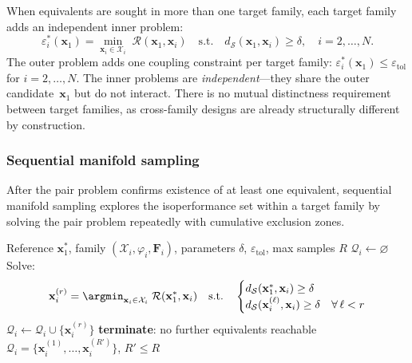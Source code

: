 When equivalents are sought in more than one target family, each target family adds an independent inner problem:
\begin{equation}
    \varepsilon_i^*(\mathbf{x}_1) = \min_{\mathbf{x}_i \in \mathcal{X}_i}\;
    \mathcal{R}(\mathbf{x}_1, \mathbf{x}_i)
    \quad \text{s.t.} \quad
    d_{\mathcal{S}}(\mathbf{x}_1, \mathbf{x}_i) \geq \delta,
    \quad i = 2, \ldots, N.
    \label{eq:multi_inner}
\end{equation}
The outer problem adds one coupling constraint per target family: $\varepsilon_i^*(\mathbf{x}_1) \leq \varepsilon_{\mathrm{tol}}$ for $i = 2, \ldots, N$. The inner problems are \emph{independent}---they share the outer candidate~$\mathbf{x}_1$ but do not interact. There is no mutual distinctness requirement between target families, as cross-family designs are already structurally different by construction.


\subsubsection{Sequential manifold sampling}
\label{sec:sampling}

After the pair problem confirms existence of at least one equivalent, sequential manifold sampling explores the isoperformance set within a target family by solving the pair problem repeatedly with cumulative exclusion zones.

\begin{algorithm}
\caption{Sequential manifold sampling within family~$i$}
\label{alg:sampling}
\begin{algorithmic}[1]
\REQUIRE Reference $\mathbf{x}_1^*$, family $(\mathcal{X}_i, \varphi_i, \mathbf{F}_i)$, parameters $\delta$, $\varepsilon_{\mathrm{tol}}$, max samples $R$
\STATE $\mathcal{Q}_i \gets \varnothing$
    \STATE Solve:
    \[
        \mathbf{x}_i^{(r)} = \argmin_{\mathbf{x}_i \in \mathcal{X}_i}\;
        \mathcal{R}(\mathbf{x}_1^*, \mathbf{x}_i)
        \quad \text{s.t.} \quad
        \begin{cases}
            d_{\mathcal{S}}(\mathbf{x}_1^*, \mathbf{x}_i) \geq \delta \\
            d_{\mathcal{S}}(\mathbf{x}_i^{(\ell)}, \mathbf{x}_i) \geq \delta
            & \forall\, \ell < r
        \end{cases}
    \]
        \STATE $\mathcal{Q}_i \gets \mathcal{Q}_i \cup \{\mathbf{x}_i^{(r)}\}$
    \ELSE
        \STATE \textbf{terminate}: no further equivalents reachable
    \ENDIF
\ENDFOR
\RETURN $\mathcal{Q}_i = \{\mathbf{x}_i^{(1)}, \ldots, \mathbf{x}_i^{(R')}\}$, \quad $R' \leq R$
\end{algorithmic}
\end{algorithm}

